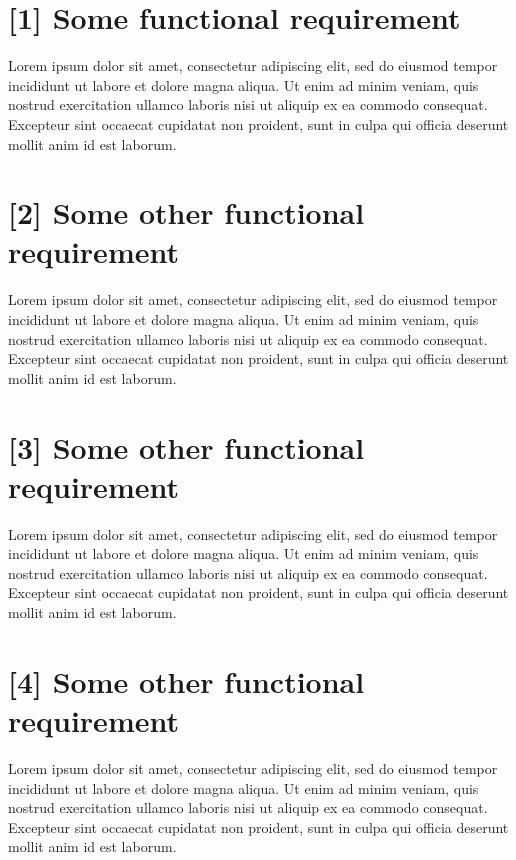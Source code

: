 \section{[1] Some functional requirement}
Lorem ipsum dolor sit amet, consectetur adipiscing elit, sed do eiusmod tempor incididunt ut labore et dolore magna aliqua. 
Ut enim ad minim veniam, quis nostrud exercitation ullamco laboris nisi ut aliquip ex ea commodo consequat. 
Excepteur sint occaecat cupidatat non proident, sunt in culpa qui officia deserunt mollit anim id est laborum.
\section{[2] Some other functional requirement}
Lorem ipsum dolor sit amet, consectetur adipiscing elit, sed do eiusmod tempor incididunt ut labore et dolore magna aliqua. 
Ut enim ad minim veniam, quis nostrud exercitation ullamco laboris nisi ut aliquip ex ea commodo consequat.
Excepteur sint occaecat cupidatat non proident, sunt in culpa qui officia deserunt mollit anim id est laborum.
\section{[3] Some other functional requirement}
Lorem ipsum dolor sit amet, consectetur adipiscing elit, sed do eiusmod tempor incididunt ut labore et dolore magna aliqua. 
Ut enim ad minim veniam, quis nostrud exercitation ullamco laboris nisi ut aliquip ex ea commodo consequat. 
Excepteur sint occaecat cupidatat non proident, sunt in culpa qui officia deserunt mollit anim id est laborum.
\section{[4] Some other functional requirement}
Lorem ipsum dolor sit amet, consectetur adipiscing elit, sed do eiusmod tempor incididunt ut labore et dolore magna aliqua. 
Ut enim ad minim veniam, quis nostrud exercitation ullamco laboris nisi ut aliquip ex ea commodo consequat. 
Excepteur sint occaecat cupidatat non proident, sunt in culpa qui officia deserunt mollit anim id est laborum.
